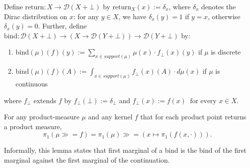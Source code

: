 \begin{definition}
	Define $\text{return} : X \to \mathcal{D}(X + \bot)$ by $\text{return}_X(x) := \delta_x$, where $\delta_x$ denotes the Dirac distribution on $x$: for any $y \in X$, we have $\delta_x(y) = 1$ if $y = x$, otherwise $\delta_x(y) = 0$. Further, define $\text{bind} : \mathcal{D}(X + \bot) \to (X \to \mathcal{D}(Y + \bot)) \to \mathcal{D}(Y + \bot)$ by:
	\begin{enumerate}
		\item $\text{bind}(\mu)(f)(y) := \sum_{x \in support(\mu)} \mu(x) \cdot f_{\bot}(x)(y)$ if $\mu$ is discrete
		\item $\text{bind}(\mu)(f)(A) := \int_{x \in support(\mu)} f_{\bot}(x)(A) \cdot d\mu(x)$ if $\mu$ is continuous
	\end{enumerate}
	where $f_{\bot}$ extends $f$ by $f_{\bot}(\bot) := \delta_{\bot}$ and $f_{\bot}(x) := f(x) \;\; \text{for every } x \in X.$
\end{definition}

\begin{lemma}\label{lem:bind-proj}
	For any product-measure $\mu$ and any kernel $f$ that for each product point returns a product measure,
	\[
		\pi_1(\mu \gg\!= f) = \pi_1(\mu) \gg\!= (x \mapsto \pi_1(f(x, \cdot))).
	\]
\end{lemma}

Informally, this lemma states that first marginal of a bind is the bind of the first marginal against the first marginal of the continuation.

